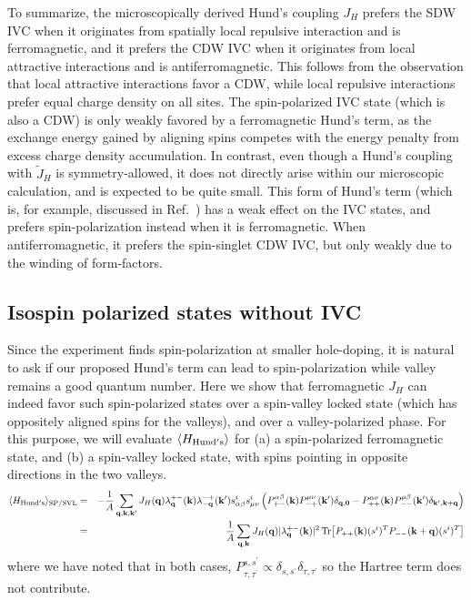 \documentclass[aps,pra,twocolumn,superscriptaddress,10pt,article,nofootinbib,showpacs,longbibliography]{revtex4-1}
\def \k{{\mathbf k}}
\def \q{{\mathbf q}}
\def \beq{\begin{eqnarray}}
\def \eeq{\end{eqnarray}}
\def \nn{\nonumber \\}
\begin{document}
To summarize, the microscopically derived Hund's coupling $J_H$ prefers the SDW IVC when it originates from spatially local repulsive interaction and is ferromagnetic, and it prefers the CDW IVC when it originates from local attractive interactions and is antiferromagnetic. 
This follows from the observation that local attractive interactions favor a CDW, while local repulsive interactions prefer equal charge density on all sites. 
The spin-polarized IVC state (which is also a CDW) is only weakly favored by a ferromagnetic Hund's term, as the exchange energy gained by aligning spins competes with the energy penalty from excess charge density accumulation. 
In contrast, even though a Hund's coupling with $\tilde{J}_H$ is symmetry-allowed, it does not directly arise within our microscopic calculation, and is expected to be quite small. 
This form of Hund's term (which is, for example, discussed in Ref.~) has a weak effect on the IVC states, and prefers spin-polarization instead when it is ferromagnetic. 
When antiferromagnetic, it prefers the spin-singlet CDW IVC, but only weakly due to the winding of form-factors.

\subsection{Isospin polarized states without IVC}
Since the experiment \cite{Zhou_ABCSC,Zhou2021_ABCmetals} finds spin-polarization at smaller hole-doping, it is natural to ask if our proposed Hund's term can lead to spin-polarization while valley remains a good quantum number. 
Here we show that ferromagnetic $J_H$ can indeed favor such spin-polarized states over a spin-valley locked state (which has oppositely aligned spins for the valleys), and over a valley-polarized phase. 
For this purpose, we will evaluate $\langle H_{\rm Hund's} \rangle$ for (a) a spin-polarized ferromagnetic state, and (b) a spin-valley locked state, with spins pointing in opposite directions in the two valleys. 
\beq
\langle H_{\rm Hund's} \rangle_{\rm SP/SVL}  &=& - \frac{1}{A} \sum_{\q, \k, \k^\prime} J_H(\q) \lambda^{+-}_{\q}(\k) \lambda^{-+}_{-\q}(\k^\prime) s^i_{\alpha \beta} s^i_{\mu \nu} \left( P^{\alpha \beta}_{+-}(\k)  P^{\mu \nu}_{-+}(\k^\prime) \delta_{\q,\mathbf{0}} - P^{\alpha \nu}_{++}(\k) P^{\mu \beta}_{--}(\k^\prime) \delta_{\k^\prime, \k + \q} \right) \nn
&=& \frac{1}{A} \sum_{\q, \k} J_H(\q) |\lambda^{+-}_{\q}(\k)|^2  \Tr[P_{++}(\k) (s^i)^T P_{--}(\k + \q) (s^i)^T]
\eeq 
where we have noted that in both cases, $P^{s,s^\prime}_{\tau,\tau^\prime} \propto \delta_{s,s^\prime} \delta_{\tau, \tau^\prime}$ so the Hartree term does not contribute.
\end{document}
